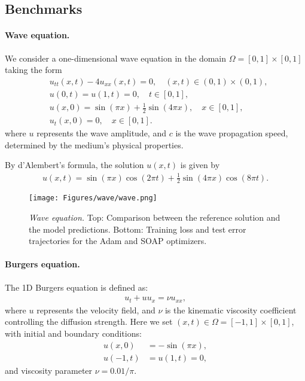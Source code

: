 \subsection{Benchmarks}
\label{appendix:benchmarks}

\paragraph{Wave equation.}  We consider a one-dimensional wave equation in the domain $\Omega=[0,1] \times[0,1]$ taking the form
\begin{align*}
    & u_{t t}(x, t)-4 u_{x x}(x, t)=0, \quad(x, t) \in(0,1) \times(0,1), \\
& u(0, t)=u(1, t)=0, \quad t \in[0,1], \\
& u(x, 0)=\sin (\pi x)+\frac{1}{2} \sin (4 \pi x), \quad x \in[0,1], \\
& u_t(x, 0)=0, \quad x \in[0,1].
\end{align*}
where  $u$ represents the wave amplitude, and $c$ is the wave propagation speed, determined by the medium's physical properties.

By d'Alembert's formula, the solution $u(x, t)$ is given by
\begin{align*}
    u(x, t)=\sin (\pi x) \cos (2 \pi t)+\frac{1}{2} \sin (4 \pi x) \cos (8 \pi t).
\end{align*}


\begin{figure}
    \centering
    \texttt{[image: Figures/wave/wave.png]}
\caption{{\em Wave equation.}  Top: Comparison between the reference solution and the model predictions. Bottom: Training loss and test error trajectories for the Adam and SOAP optimizers.}
    \label{fig:wave}
\end{figure}


\paragraph{Burgers equation.}  The 1D Burgers equation is defined as:
\begin{align*}
u_t + u u_x = \nu u_{xx},
\end{align*}
where $u$ represents the velocity field, and $\nu$ is the kinematic viscosity coefficient controlling the diffusion strength. Here we set  $(x, t) \in \Omega = [-1, 1] \times [0, 1]$, with initial and boundary conditions:
\begin{align*}
u(x, 0) &= -\sin(\pi x), \\
u(-1, t) &= u(1, t) = 0,
\end{align*}
and viscosity parameter $\nu = 0.01/\pi$.







